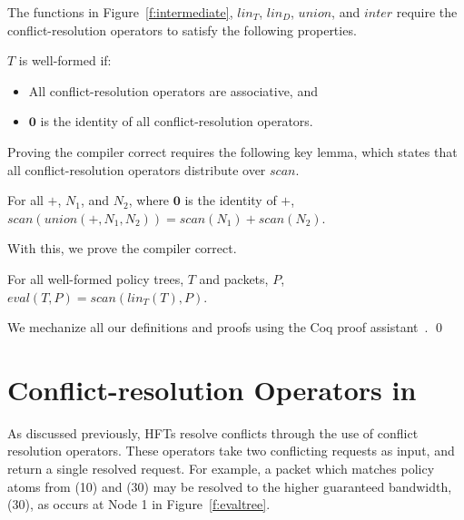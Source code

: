 The functions in Figure~\ref{f:intermediate}, $\mathit{lin}_T$,
$\mathit{lin}_D$, $\mathit{union}$, and $\mathit{inter}$ require the
conflict-resolution operators to satisfy the following properties.
\begin{wftree} 
$T$ is well-formed if:
\begin{itemize}

\item All conflict-resolution operators are associative, and

\item $\textbf{0}$ is the identity of all conflict-resolution operators.
\end{itemize}
\end{wftree}
Proving the compiler correct requires the following key lemma, which
states that all conflict-resolution operators distribute over $\mathit{scan}$.
\begin{unioncommute}
For all $+$, $N_1$, and $N_2$, where $\textbf{0}$ is the identity of $+$,
$\mathit{scan}(\mathit{union}(+,N_1,N_2)) = \mathit{scan}(N_1) +
\mathit{scan}(N_2)$.
\end{unioncommute}
With this, we prove the compiler correct.
\begin{compilercorrect}[Soundness]
For all well-formed policy trees, $T$ and packets, $P$, $\mathit{eval}(T, P) =
\mathit{scan}(\mathit{lin}_T(T), P)$.
\end{compilercorrect}
We mechanize all our definitions and proofs using the Coq proof assistant~\cite{coq}. \qed

\section{Conflict-resolution Operators in \sys}
\label{sec:conflict-resolution-operators}


As discussed previously, HFTs resolve conflicts through the use of conflict resolution operators.
These operators take two conflicting requests as input, and return a single
resolved request. For example, a packet which matches policy atoms from (10)
and (30) may be resolved to the higher guaranteed bandwidth,
(30), as occurs at Node 1 in Figure~\ref{f:evaltree}.

